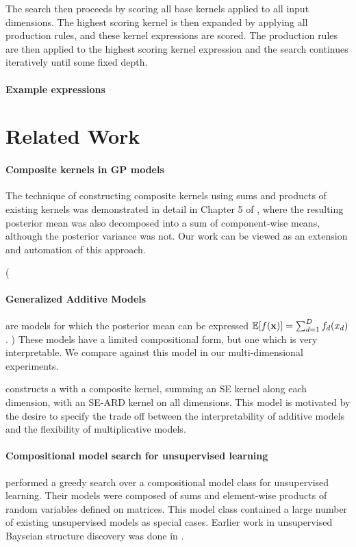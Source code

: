 \documentclass[twoside]{article}
\begin{document}
The search then proceeds by scoring all base kernels applied to all input dimensions.
The highest scoring kernel is then expanded by applying all production rules, and these kernel expressions are scored.
The production rules are then applied to the highest scoring kernel expression and the search continues iteratively until some fixed depth.

\paragraph{Example expressions}


\section{Related Work}

\paragraph{Composite kernels in GP models} The technique of constructing composite kernels using sums and products of existing kernels was demonstrated in detail in Chapter 5 of \cite{rasmussen38gaussian}, where the resulting posterior mean was also decomposed into a sum of component-wise means, although the posterior variance was not.  Our work can be viewed as an extension and automation of this approach.

\NA(\paragraph{Generalized Additive Models} \cite{hastie1990generalized} are models for which the posterior mean can be expressed $\mathbb{E}[f({\bf{x}})] = \sum_{d=1}^D f_d(x_d)$.  ) These models have a limited compositional form, but one which is very interpretable.  We compare against this model in our multi-dimensional experiments.

\cite{plate1999accuracy} constructs a \gp{} with a composite kernel, summing an SE kernel along each dimension, with an SE-ARD kernel on all dimensions.  This model is motivated by the desire to specify the trade off between the interpretability of additive models and the flexibility of multiplicative models.

\paragraph{Compositional model search for unsupervised learning} \cite{grosse2012exploiting} performed a greedy search over a compositional model class for unsupervised learning.  Their models were composed of sums and element-wise products of random variables defined on matrices.  This model class contained a large number of existing unsupervised models as special cases.  Earlier work in unsupervised Bayseian structure discovery was done in \cite{kemp2008discovery}.
\end{document}
